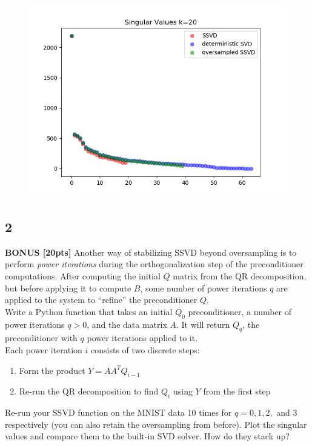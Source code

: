 \documentclass[paper=a4, fontsize=11pt]{scrartcl} %
\numberwithin{figure}{section} %
\numberwithin{table}{section} %
\begin{document}
\begin{figure}[H]

\includegraphics{sing_values_9.png}
\end{figure}

\subsection*{2}


\textbf{BONUS [20pts]} Another way of stabilizing SSVD beyond oversampling is to perform \emph{power iterations} during the orthogonalization step of the preconditioner computations. After computing the initial $Q$ matrix from the QR decomposition, but before applying it to compute $B$, some number of power iterations $q$ are applied to the system to ``refine'' the preconditioner $Q$. \\

Write a Python function that takes an initial $Q_0$ preconditioner, a number of power iterations $q > 0$, and the data matrix $A$. It will return $Q_q$, the preconditioner with $q$ power iterations applied to it. \\

Each power iteration $i$ consists of two discrete steps:
\begin{enumerate}
	\item Form the product $Y = AA^TQ_{i - 1}$
	\item Re-run the QR decomposition to find $Q_i$ using $Y$ from the first step
\end{enumerate}

Re-run your SSVD function on the MNIST data 10 times for $q = 0, 1, 2,$ and 3 respectively (you can also retain the oversampling from before). Plot the singular values and compare them to the built-in SVD solver. How do they stack up? \\
\end{document}
